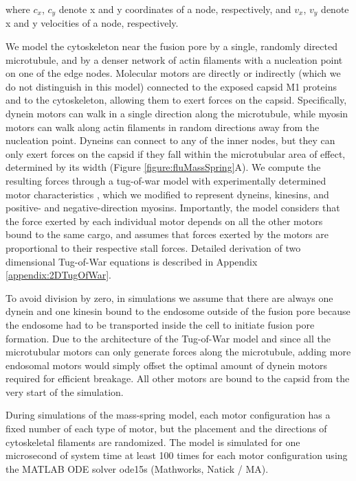 where $c_x$, $c_y$ denote x and y coordinates of a node, respectively, and $v_x$, $v_y$ denote x and y velocities of a node, respectively. 

We model the cytoskeleton near the fusion pore by a single, randomly directed microtubule, and by a denser network of actin filaments with a nucleation point on one of the edge nodes. Molecular motors are directly or indirectly (which we do not distinguish in this model) connected to the exposed capsid M1 proteins and to the cytoskeleton, allowing them to exert forces on the capsid. Specifically, dynein motors can walk in a single direction along the microtubule, while myosin motors can walk along actin filaments in random directions away from the nucleation point. Dyneins can connect to any of the inner nodes, but they can only exert forces on the capsid if they fall within the microtubular area of effect, determined by its width (Figure \ref{figure:fluMassSpring}A).
We compute the resulting forces through a tug-of-war model with experimentally determined motor characteristics \cite{gennerich2007force, muller2008tug, norstrom2010unconventional}, which we modified to represent dyneins, kinesins, and positive- and negative-direction myosins. Importantly, the model considers that the force exerted by each individual motor depends on all the other motors bound to the same cargo, and assumes that forces exerted by the motors are proportional to their respective stall forces. Detailed derivation of two dimensional Tug-of-War equations is described in Appendix \ref{appendix:2DTugOfWar}.
 
To avoid division by zero, in simulations we assume that there are always one dynein and one kinesin bound to the endosome outside of the fusion pore because the endosome had to be transported inside the cell to initiate fusion pore formation. Due to the architecture of the Tug-of-War model and since all the microtubular motors can only generate forces along the microtubule, adding more endosomal motors would simply offset the optimal amount of dynein motors required for efficient breakage. All other motors are bound to the capsid from the very start of the simulation.
 
During simulations of the mass-spring model, each motor configuration has a fixed number of each type of motor, but the placement and the directions of cytoskeletal filaments are randomized. The model is simulated for one microsecond of system time at least 100 times for each motor configuration using the MATLAB ODE solver ode15s (Mathworks, Natick / MA).

